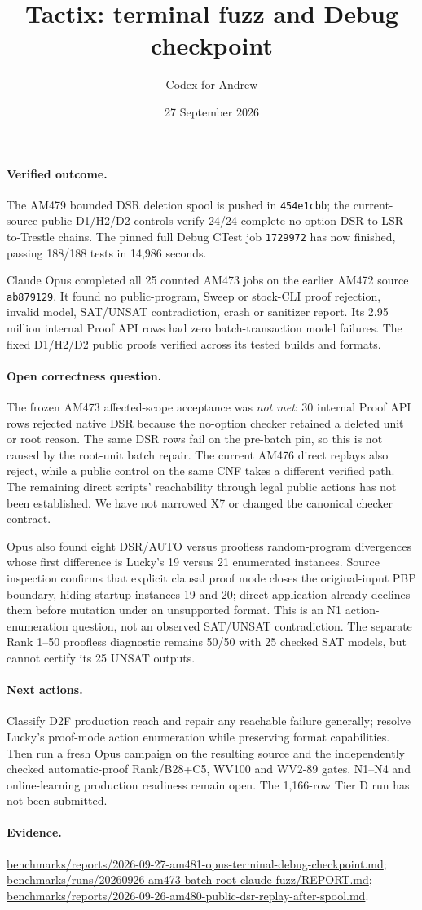 \documentclass[11pt]{article}
\title{Tactix: terminal fuzz and Debug checkpoint}
\author{Codex for Andrew}
\date{27 September 2026}
\begin{document}
\maketitle

\paragraph{Verified outcome.}
The AM479 bounded DSR deletion spool is pushed in \texttt{454e1cbb}; the
current-source public D1/H2/D2 controls verify 24/24 complete no-option
DSR-to-LSR-to-Trestle chains. The pinned full Debug CTest job
\texttt{1729972} has now finished, passing 188/188 tests in 14,986 seconds.

Claude Opus completed all 25 counted AM473 jobs on the earlier AM472 source
\texttt{ab879129}. It found no public-program, Sweep or stock-CLI proof
rejection, invalid model, SAT/UNSAT contradiction, crash or sanitizer report.
Its 2.95 million internal Proof API rows had zero batch-transaction model
failures. The fixed D1/H2/D2 public proofs verified across its tested builds
and formats.

\paragraph{Open correctness question.}
The frozen AM473 affected-scope acceptance was \emph{not met}: 30 internal
Proof API rows rejected native DSR because the no-option checker retained a
deleted unit or root reason. The same DSR rows fail on the pre-batch pin, so
this is not caused by the root-unit batch repair. The current AM476 direct
replays also reject, while a public control on the same CNF takes a different
verified path. The remaining direct scripts' reachability through legal
public actions has not been established. We have not narrowed X7 or changed
the canonical checker contract.

Opus also found eight DSR/AUTO versus proofless random-program divergences
whose first difference is Lucky's 19 versus 21 enumerated instances. Source
inspection confirms that explicit clausal proof mode closes the original-input
PBP boundary, hiding startup instances 19 and 20; direct application already
declines them before mutation under an unsupported format. This is an N1
action-enumeration question, not an observed SAT/UNSAT contradiction. The
separate Rank 1--50 proofless diagnostic remains 50/50 with 25 checked SAT
models, but cannot certify its 25 UNSAT outputs.

\paragraph{Next actions.}
Classify D2F production reach and repair any reachable failure generally;
resolve Lucky's proof-mode action enumeration while preserving format
capabilities. Then run a fresh Opus campaign on the resulting source and the
independently checked automatic-proof Rank/B28+C5, WV100 and WV2-89 gates.
N1--N4 and online-learning production readiness remain open. The 1,166-row
Tier D run has not been submitted.

\paragraph{Evidence.}
\url{benchmarks/reports/2026-09-27-am481-opus-terminal-debug-checkpoint.md};
\url{benchmarks/runs/20260926-am473-batch-root-claude-fuzz/REPORT.md};
\url{benchmarks/reports/2026-09-26-am480-public-dsr-replay-after-spool.md}.
\end{document}
